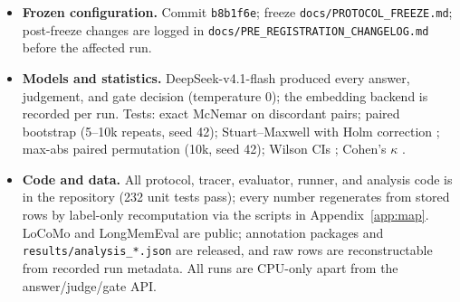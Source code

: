 \documentclass[11pt]{article}
\begin{document}
\begin{itemize}
\item \textbf{Frozen configuration.} Commit \texttt{b8b1f6e}; freeze
\texttt{docs/PROTOCOL\_FREEZE.md}; post-freeze changes are logged in
\texttt{docs/PRE\_REGISTRATION\_CHANGELOG.md} before the affected run.
\item \textbf{Models and statistics.} DeepSeek-v4.1-flash produced every
answer, judgement, and gate decision (temperature 0); the embedding backend is
recorded per run. Tests: exact McNemar \citep{mcnemar1947} on discordant
pairs; paired bootstrap (5--10k repeats, seed 42); Stuart--Maxwell
\citep{stuart1955,maxwell1970} with Holm correction \citep{holm1979};
max-abs paired permutation (10k, seed 42); Wilson CIs \citep{wilson1927};
Cohen's $\kappa$ \citep{cohen1960}.
\item \textbf{Code and data.} All protocol, tracer, evaluator, runner, and
analysis code is in the repository (232 unit tests pass); every number
regenerates from stored rows by label-only recomputation via the scripts in
Appendix~\ref{app:map}. LoCoMo and LongMemEval are public; annotation packages
and \texttt{results/analysis\_*.json} are released, and raw rows are
reconstructable from recorded run metadata. All runs are CPU-only apart from
the answer/judge/gate API.
\end{itemize}
\end{document}
